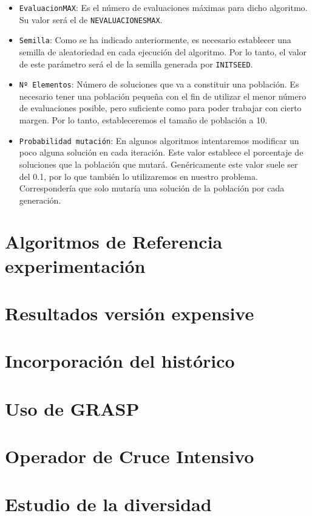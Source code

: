 \begin{itemize}
	\item \texttt{EvaluacionMAX}: Es el número de evaluaciones máximas para dicho algoritmo. 
Su valor será el de \texttt{NEVALUACIONESMAX}.
	\item \texttt{Semilla}: Como se ha indicado anteriormente, es necesario establecer una semilla de aleatoriedad en cada ejecución del algoritmo. 
Por lo tanto, el valor de este parámetro será el de la semilla generada por \texttt{INITSEED}. 
	\item \texttt{Nº Elementos}: Número de soluciones que va a constituir una población. 
Es necesario tener una población pequeña con el fin de utilizar el menor número de evaluaciones posible, pero suficiente como para poder trabajar con cierto margen. 
Por lo tanto, estableceremos el tamaño de población a 10. 
	\item \texttt{Probabilidad mutación}: En algunos algoritmos intentaremos modificar un poco alguna solución en cada iteración. 
Este valor establece el porcentaje de soluciones que la población que mutará. 
Genéricamente este valor suele ser del 0.1, por lo que también lo utilizaremos en nuestro problema. 
Correspondería que solo mutaría una solución de la población por cada generación. 
\end{itemize}
\section{Algoritmos de Referencia experimentación}

\section{Resultados versión expensive}

\section{Incorporación del histórico}

\section{Uso de GRASP}

\section{Operador de Cruce Intensivo}

\section{Estudio de la diversidad}

